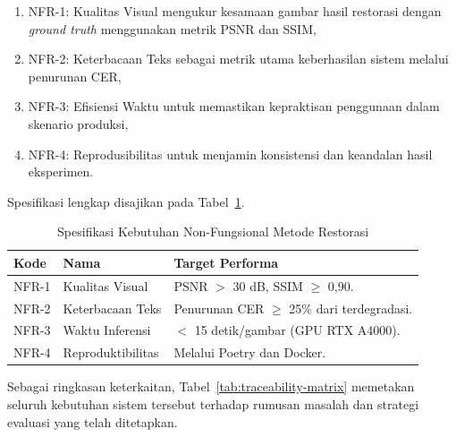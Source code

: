 \documentclass[12pt,a4paper]{article}
\begin{document}
\begin{enumerate}[label=\arabic*., leftmargin=*]
\begin{enumerate}[label=(\alph*), nosep]
    \item NFR-1: Kualitas Visual mengukur kesamaan gambar hasil restorasi dengan \textit{ground truth} menggunakan metrik PSNR dan SSIM,
    \item NFR-2: Keterbacaan Teks sebagai metrik utama keberhasilan sistem melalui penurunan CER,
    \item NFR-3: Efisiensi Waktu untuk memastikan kepraktisan penggunaan dalam skenario produksi,
    \item NFR-4: Reprodusibilitas untuk menjamin konsistensi dan keandalan hasil eksperimen.
\end{enumerate}

Spesifikasi lengkap disajikan pada Tabel~\ref{tab:non_functional_requirements}.

\begin{table}[htbp!]
    \centering
    \small
    \caption{Spesifikasi Kebutuhan Non-Fungsional Metode Restorasi}
    \label{tab:non_functional_requirements}
    \begin{tabular}{p{}p{}p{}}
        \toprule
        \textbf{Kode} & \textbf{Nama}    & \textbf{Target Performa}                         \\
        \midrule
        NFR-1         & Kualitas Visual  & PSNR $>$ 30 dB, SSIM $\geq$ 0,90.                \\
        \midrule
        NFR-2         & Keterbacaan Teks & Penurunan CER $\geq$ 25\% dari terdegradasi.     \\
        \midrule
        NFR-3         & Waktu Inferensi  & $<$ 15 detik/gambar (GPU RTX A4000).             \\
        \midrule
        NFR-4         & Reproduktibilitas  & Melalui Poetry dan Docker.             \\
        \bottomrule
    \end{tabular}
\end{table}
\end{enumerate}



Sebagai ringkasan keterkaitan, Tabel~\ref{tab:traceability-matrix} memetakan seluruh kebutuhan sistem tersebut terhadap rumusan masalah dan strategi evaluasi yang telah ditetapkan.
\end{document}
